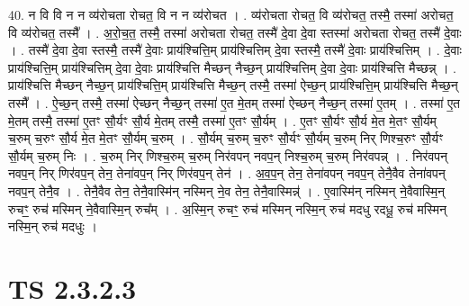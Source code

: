 \documentclass[17pt]{extarticle}
\begin{document}
40. न वि वि न न व्य॑रोचता रोचत॒ वि न न व्य॑रोचत । . व्य॑रोचता रोचत॒ वि व्य॑रोचत॒ तस्मै॒ तस्मा॑ अरोचत॒ वि व्य॑रोचत॒ तस्मै᳚ । . अ॒रो॒च॒त॒ तस्मै॒ तस्मा॑ अरोचता रोचत॒ तस्मै॑ दे॒वा दे॒वा स्तस्मा॑ अरोचता रोचत॒ तस्मै॑ दे॒वाः । . तस्मै॑ दे॒वा दे॒वा स्तस्मै॒ तस्मै॑ दे॒वाः प्राय॑श्चित्ति॒म् प्राय॑श्चित्तिम् दे॒वा स्तस्मै॒ तस्मै॑ दे॒वाः प्राय॑श्चित्तिम् । . दे॒वाः प्राय॑श्चित्ति॒म् प्राय॑श्चित्तिम् दे॒वा दे॒वाः प्राय॑श्चित्ति मैच्छन् नैच्छ॒न् प्राय॑श्चित्तिम् दे॒वा दे॒वाः प्राय॑श्चित्ति मैच्छन्न् । . प्राय॑श्चित्ति मैच्छन् नैच्छ॒न् प्राय॑श्चित्ति॒म् प्राय॑श्चित्ति मैच्छ॒न् तस्मै॒ तस्मा॑ ऐच्छ॒न् प्राय॑श्चित्ति॒म् प्राय॑श्चित्ति मैच्छ॒न् तस्मै᳚ । . ऐ॒च्छ॒न् तस्मै॒ तस्मा॑ ऐच्छन् नैच्छ॒न् तस्मा॑ ए॒त मे॒तम् तस्मा॑ ऐच्छन् नैच्छ॒न् तस्मा॑ ए॒तम् । . तस्मा॑ ए॒त मे॒तम् तस्मै॒ तस्मा॑ ए॒तꣳ सौ॒र्यꣳ सौ॒र्य मे॒तम् तस्मै॒ तस्मा॑ ए॒तꣳ सौ॒र्यम् । . ए॒तꣳ सौ॒र्यꣳ सौ॒र्य मे॒त मे॒तꣳ सौ॒र्यम् च॒रुम् च॒रुꣳ सौ॒र्य मे॒त मे॒तꣳ सौ॒र्यम् च॒रुम् । . सौ॒र्यम् च॒रुम् च॒रुꣳ सौ॒र्यꣳ सौ॒र्यम् च॒रुम् निर् णिश्च॒रुꣳ सौ॒र्यꣳ सौ॒र्यम् च॒रुम् निः । . च॒रुम् निर् णिश्च॒रुम् च॒रुम् निर॑वपन् नवप॒न् निश्च॒रुम् च॒रुम् निर॑वपन्न् । . निर॑वपन् नवप॒न् निर् णिर॑वप॒न् तेन॒ तेना॑वप॒न् निर् णिर॑वप॒न् तेन॑ । . अ॒व॒प॒न् तेन॒ तेना॑वपन् नवप॒न् तेनै॒वैव तेना॑वपन् नवप॒न् तेनै॒व । . तेनै॒वैव तेन॒ तेनै॒वास्मि॑न् नस्मिन् ने॒व तेन॒ तेनै॒वास्मिन्न्॑ । . ए॒वास्मि॑न् नस्मिन् ने॒वैवास्मि॒न् रुचꣳ॒॒ रुच॑ मस्मिन् ने॒वैवास्मि॒न् रुच᳚म् । . अ॒स्मि॒न् रुचꣳ॒॒ रुच॑ मस्मिन् नस्मि॒न् रुच॑ मदधु रदधू॒ रुच॑ मस्मिन् नस्मि॒न् रुच॑ मदधुः । \newline
\pagebreak
{}

\section{ TS 2.3.2.3 }
\end{document}
